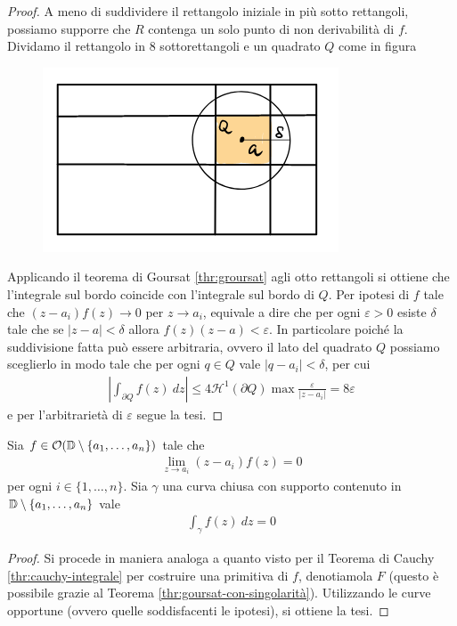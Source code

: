 \begin{proof}
	A meno di suddividere il rettangolo iniziale in più sotto rettangoli, possiamo supporre che $R$ contenga un solo punto di non derivabilità di $f$. Dividamo il rettangolo in $8$ sottorettangoli e un quadrato $Q$ come in figura
	\begin{figure}[h]
		\centering
		\includegraphics[width=0.4\linewidth]{./images/analisi_complessa/rectangles-singularity-integration.png}
		\caption{}
		\label{fig:rectangles-singularity-integration}
	\end{figure}
	Applicando il teorema di Goursat \ref{thr:groursat} agli otto rettangoli si ottiene che l'integrale sul bordo coincide con l'integrale sul bordo di $Q$. 
	Per ipotesi di $f$ tale che $(z-a_i)f(z) \to 0$ per $z \to a_i$, equivale a dire che per ogni $\varepsilon > 0$ esiste $\delta$ tale che se $|z - a| < \delta$ allora $f(z)(z-a) < \varepsilon$. In particolare poiché la suddivisione fatta può essere arbitraria, ovvero il lato del quadrato $Q$ possiamo sceglierlo in modo tale che per ogni $q\in Q$ vale $|q-a_i| < \delta$, per cui
	\begin{equation*}
	\begin{aligned}
	\left|\int_{\partial Q} f(z)\ dz\right| \le 4 \mathcal{H}^1(\partial Q) \max \frac{\varepsilon }{|z-a_i|} = 8\varepsilon 
	\end{aligned}
	\end{equation*}
	e per l'arbitrarietà di $\varepsilon$ segue la tesi.
\end{proof}

\begin{corollary}
	Sia $f \in \mathcal{O}(\mathbb{D} \setminus \{a_1, \dots, a_n\})$ tale che
	\begin{equation*}
	\begin{aligned}
	\lim_{z\to a_i} (z-a_i)f(z) = 0
	\end{aligned}
	\end{equation*}
	per ogni $i \in \{1, \dots, n\}$. Sia $\gamma$ una curva chiusa con supporto contenuto in $\mathbb{D} \setminus  \{a_1, \dots, a_n\}$ vale
	\begin{equation*}
	\begin{aligned}
	\int_{\gamma} f(z)\ dz = 0
	\end{aligned}
	\end{equation*}
\end{corollary}
\begin{proof}
	Si procede in maniera analoga a quanto visto per il Teorema di Cauchy \ref{thr:cauchy-integrale} per costruire una primitiva di $f$, denotiamola $F$ (questo è possibile grazie al Teorema \ref{thr:goursat-con-singolarità}). Utilizzando le curve opportune (ovvero quelle soddisfacenti le ipotesi), si ottiene la tesi.
\end{proof}
